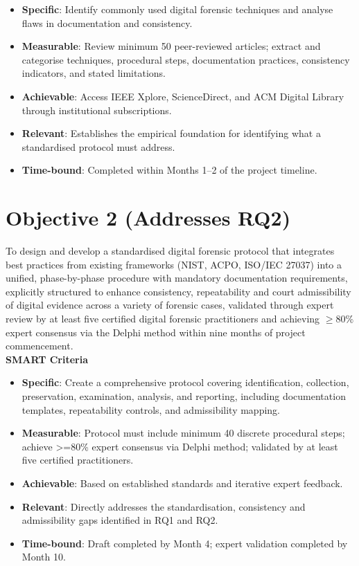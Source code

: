 \documentclass[a4paper]{report}
\begin{document}
\begin{justify}
\begin{itemize}
    \item \textbf{Specific}: Identify commonly used digital forensic techniques and analyse flaws in documentation and consistency.
    \item \textbf{Measurable}: Review minimum 50 peer-reviewed articles; extract and categorise techniques, procedural steps, documentation practices, consistency indicators, and stated limitations.
    \item \textbf{Achievable}: Access IEEE Xplore, ScienceDirect, and ACM Digital Library through institutional subscriptions.
    \item \textbf{Relevant}: Establishes the empirical foundation for identifying what a standardised protocol must address.
    \item \textbf{Time-bound}: Completed within Months 1–2 of the project timeline.
\end{itemize}

\section{Objective 2 (Addresses RQ2)}

To design and develop a standardised digital forensic protocol that integrates best practices from existing frameworks (NIST, ACPO, ISO/IEC 27037) into a unified, phase-by-phase procedure with mandatory documentation requirements, explicitly structured to enhance consistency, repeatability and court admissibility of digital evidence across a variety of forensic cases, validated through expert review by at least five certified digital forensic practitioners and achieving $\geq 80\%$ expert consensus via the Delphi method within nine months of project commencement.
\\
\textbf{SMART Criteria}

\begin{itemize}
    \item \textbf{Specific}: Create a comprehensive protocol covering identification, collection, preservation, examination, analysis, and reporting, including documentation templates, repeatability controls, and admissibility mapping.
    \item \textbf{Measurable}: Protocol must include minimum 40 discrete procedural steps; achieve >=80\% expert consensus via Delphi method; validated by at least five certified practitioners.
    \item \textbf{Achievable}: Based on established standards and iterative expert feedback.
    \item \textbf{Relevant}: Directly addresses the standardisation, consistency and admissibility gaps identified in RQ1 and RQ2.
    \item \textbf{Time-bound}: Draft completed by Month 4; expert validation completed by Month 10.
\end{itemize}


\end{justify}
\end{document}
